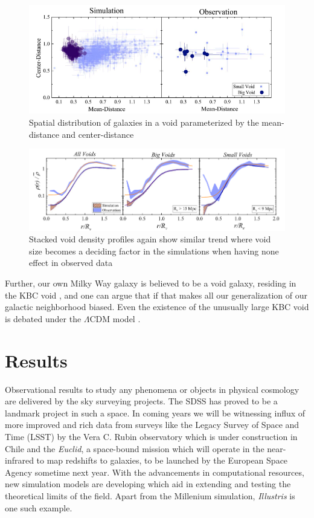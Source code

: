 \documentclass[fleqn,usenatbib]{mnras}
\begin{document}
\begin{figure}
	\centering
	\includegraphics[scale = 0.4]{tav1}
	\caption{Spatial distribution of galaxies in a void parameterized by the mean-distance and center-distance}
	\label{fig:tav1}
\end{figure}
\begin{figure}
	\centering
	\includegraphics[scale = 0.35]{tav2}
	\caption{Stacked void density profiles again show similar trend where void size becomes a deciding factor in the simulations when having none effect in observed data}
	\label{fig:tav2}
\end{figure}


Further, our own Milky Way galaxy is believed to be a void galaxy, residing in the KBC void \citep{keenan_evidence_2013, abdalla_cosmology_2022}, and one can argue that if that makes all our generalization of our galactic neighborhood biased. Even the existence of the unusually large KBC void is debated under the $ \Lambda $CDM model \citep{haslbauer_kbc_2020}.


\section{Results}
Observational results to study any phenomena or objects in physical cosmology are delivered by the sky surveying projects. The SDSS has proved to be a landmark project in such a space. In coming years we will be witnessing influx of more improved and rich data from surveys like the Legacy Survey of Space and Time (LSST) by the Vera C. Rubin observatory which is under construction in Chile and the \textit{Euclid}, a space-bound mission which will operate in the near-infrared to map redshifts to galaxies, to be launched by the European Space Agency sometime next year. With the advancements in computational resources, new simulation models are developing which aid in extending and testing the theoretical limits of the field. Apart from the Millenium simulation, \textit{Illustris} is one such example.
\end{document}
